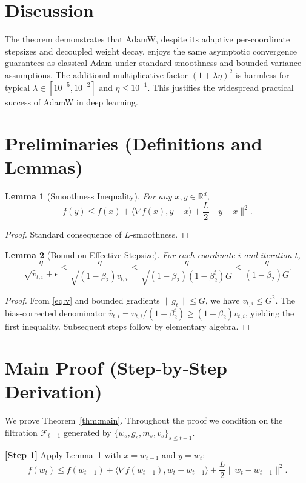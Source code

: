 \documentclass[11pt]{article}
\newtheorem{lemma}{Lemma}
\newcommand{\R}{\mathbb{R}}
\begin{document}
\section*{Discussion}
The theorem demonstrates that AdamW, despite its adaptive per‑coordinate stepsizes and decoupled weight decay, enjoys the same asymptotic convergence guarantees as classical Adam under standard smoothness and bounded‑variance assumptions. The additional multiplicative factor $(1+\lambda\eta)^{2}$ is harmless for typical $\lambda\in[10^{-5},10^{-2}]$ and $\eta\le 10^{-1}$. This justifies the widespread practical success of AdamW in deep learning.

\newpage
\section*{Preliminaries (Definitions and Lemmas)}
\begin{lemma}[Smoothness Inequality]
\label{lem:smooth}
For any $x,y\in\R^{d}$,
\[
f(y)\le f(x)+\langle\nabla f(x),y-x\rangle+\frac{L}{2}\|y-x\|^{2}.
\]
\end{lemma}
\begin{proof}
Standard consequence of $L$‑smoothness. \qedhere
\end{proof}

\begin{lemma}[Bound on Effective Stepsize]
\label{lem:stepsize}
For each coordinate $i$ and iteration $t$,
\[
\frac{\eta}{\sqrt{\hat v_{t,i}}+\epsilon}\le
\frac{\eta}{\sqrt{(1-\beta_2)v_{t,i}}}\le
\frac{\eta}{\sqrt{(1-\beta_2)(1-\beta_2^{t})}G}
\le
\frac{\eta}{(1-\beta_2)G}.
\]
\end{lemma}
\begin{proof}
From \eqref{eq:v} and bounded gradients $\|g_t\|\le G$, we have $v_{t,i}\le G^{2}$. The bias‑corrected denominator $\hat v_{t,i}=v_{t,i}/(1-\beta_2^{t})\ge (1-\beta_2)v_{t,i}$, yielding the first inequality. Subsequent steps follow by elementary algebra. \qedhere
\end{proof}

\section*{Main Proof (Step‑by‑Step Derivation)}
We prove Theorem~\ref{thm:main}. Throughout the proof we condition on the filtration $\mathcal{F}_{t-1}$ generated by $\{w_s,g_s,m_s,v_s\}_{s\le t-1}$.

\bigskip
\noindent\textbf{[Step 1]} Apply Lemma~\ref{lem:smooth} with $x=w_{t-1}$ and $y=w_t$:
\[
f(w_t)\le f(w_{t-1})+\langle\nabla f(w_{t-1}),w_t-w_{t-1}\rangle+\frac{L}{2}\|w_t-w_{t-1}\|^{2}.
\tag{1}
\]
\end{document}
